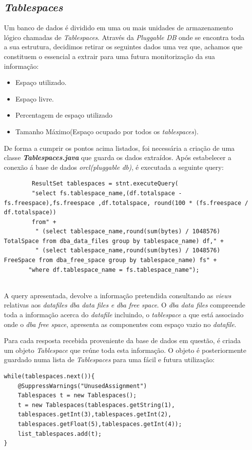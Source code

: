 \subsection*{\textit{Tablespaces}}
Um banco de dados é dividido em uma ou mais unidades de armazenamento lógico chamadas de \textit{Tablespaces}. Através da \textit{Pluggable DB} onde se encontra toda a sua estrutura, decidimos retirar os seguintes dados uma vez que, achamos que constituem o essencial a extrair para uma futura monitorização da sua informação:
\begin{itemize}
    \item Espaço utilizado.
    \item Espaço livre.
    \item Percentagem de espaço utilizado
	\item Tamanho Máximo(Espaço ocupado por todos os \textit{tablespaces}).
\end{itemize}
De forma a cumprir os pontos acima listados, foi necessária a criação de uma classe \textit{\textbf{Tablespaces.java}} que guarda os dados extraídos.
Após estabelecer a conexão á base de dados \textit{orcl(pluggable db)}, é executada a seguinte query:
\vspace{2mm}
\begin{lstlisting}
        ResultSet tablespaces = stnt.executeQuery(
        "select fs.tablespace_name,(df.totalspace - fs.freespace),fs.freespace ,df.totalspace, round(100 * (fs.freespace / df.totalspace)) 
        from" +
         " (select tablespace_name,round(sum(bytes) / 1048576) TotalSpace from dba_data_files group by tablespace_name) df," +
         " (select tablespace_name,round(sum(bytes) / 1048576) FreeSpace from dba_free_space group by tablespace_name) fs" +
       "where df.tablespace_name = fs.tablespace_name");
     
\end{lstlisting}
\vspace{2mm}
A query apresentada, devolve a informação pretendida consultando as \textit{views} relativas aos \textit{datafiles dba data files e dba free space}. O \textit{dba data files} compreende toda a informação acerca do \textit{datafile} incluindo, o \textit{tablespace} a que está associado onde o \textit{dba free space}, apresenta as componentes com espaço vazio no \textit{datafile}.

Para cada resposta recebida proveniente da base de dados em questão, é criada um objeto \textit{Tablespace} que reúne toda esta informação. O objeto é posteriormente guardado numa lista de \textit{Tablespaces} para uma fácil e futura utilização:
\vspace{2mm}
\begin{lstlisting}
while(tablespaces.next()){
    @SuppressWarnings("UnusedAssignment")
    Tablespaces t = new Tablespaces();
    t = new Tablespaces(tablespaces.getString(1),
    tablespaces.getInt(3),tablespaces.getInt(2),
    tablespaces.getFloat(5),tablespaces.getInt(4));
    list_tablespaces.add(t);
}
\end{lstlisting}
